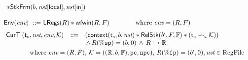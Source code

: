 \begin{figure}[!t]
\[\begin{array}{l}
\begin{array}{lll}
                \sepstar \RelStkFm{\block}{\nst[\localRN]}{\nst[\inRN]}
            \end{array}
            \\
            \\
            \Env{\env} \ \define \ 
                \LRegs{\RFile} \sepstar 
                \wfwin{\RFile}{\Wstack} \qquad \qquad 
                \text{where} \ \env = (\RFile, \Wstack)
                \\
            \\[-5pt]
            \hspace*{-0.15em}
            \begin{array}{lll}
                \RelCurTAux{\thrdid_c}{\nst}{\env}{\hthrdlocalst} & \define &
                (\relcontext{\thrdid_c}{\block}{\nst} \sepstar 
                \RelStk{\block'}{\Wstack}{\hWstk} \sepstar (\astCurCont{\thrdid_c}{\hthrdlocalst})) \\
                & & \, \land \,  \RFile(\spreg) = (\block, 0) \, \land \, 
                \Rinj{\RFile}{\hRfile}
            \end{array}
            \\
            \\[-9pt]
            \qquad\qquad
            \text{where} \ \env = (\RFile, \Wstack), \, 
            \hthrdlocalst = ((\hRfile, \block, \hWstk), \pc, \npc), 
            \, \RFile(\fpreg) = (\block', 0), \nst \in \text{RegFile} \\

\end{array}\]
\end{figure}
